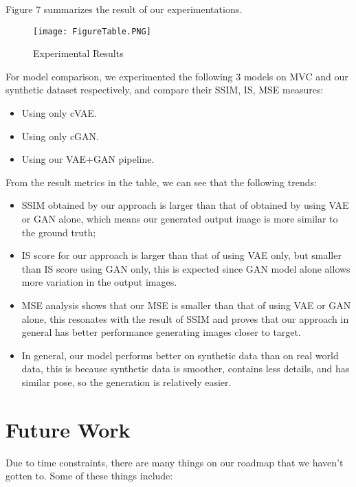 \documentclass[10pt,conference]{IEEEtran}
\begin{document}
Figure 7 summarizes the result of our experimentations.
\begin{figure*}
  \texttt{[image: FigureTable.PNG]}
  \caption{Experimental Results}
  \label{fig:boat1}
\end{figure*}

For model comparison, we experimented the following 3 models on MVC and our synthetic dataset respectively, and compare their SSIM, IS, MSE measures:

\begin{itemize}
\item Using only cVAE.
\item Using only cGAN.
\item Using our VAE+GAN pipeline.
\end{itemize}

From the result metrics in the table, we can see that the following trends: 

\begin{itemize}
\item SSIM obtained by our approach is larger than that of obtained by using VAE or GAN alone, which means our generated output image is more similar to the ground truth; 
\item IS score for our approach is larger than that of using VAE only, but smaller than IS score using GAN only, this is expected since GAN model alone allows more variation in the output images. 
\item MSE analysis shows that our MSE is smaller than that of using VAE or GAN alone, this resonates with the result of SSIM and proves that our approach in general has better performance generating images closer to target. 
\item In general, our model performs better on synthetic data than on real world data, this is because synthetic data is smoother, contains less details, and has similar pose, so the generation is relatively easier.
\end{itemize}

\section{Future Work}

Due to time constraints, there are many things on our roadmap that we haven't gotten to. Some of these things include:
\end{document}

